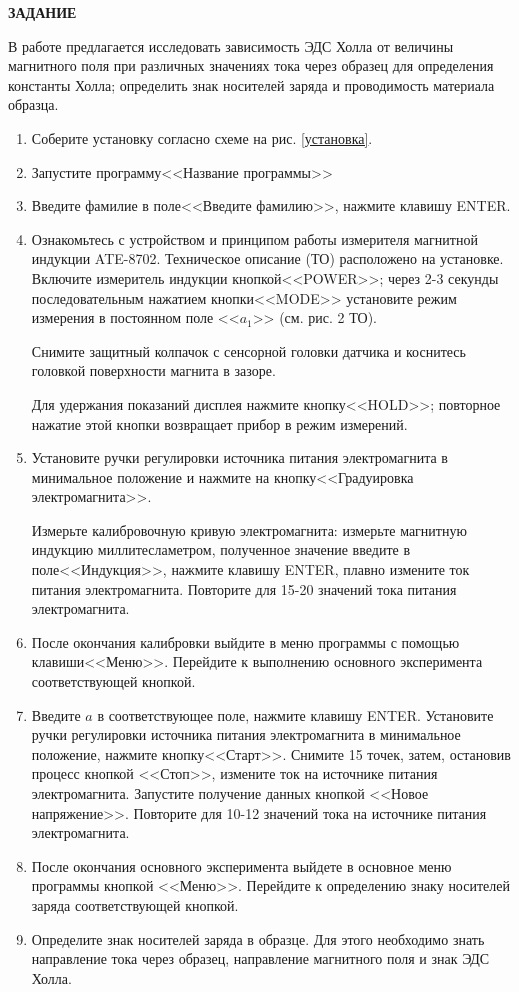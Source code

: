 \documentclass[a4paper,12pt]{article} %
\begin{document}
\begin{center}
\textsf{\textbf{ЗАДАНИЕ}}
\end{center}
В работе предлагается исследовать зависимость ЭДС Холла от величины магнитного поля при различных значениях тока через образец для
определения константы Холла; определить знак носителей заряда и проводимость материала образца.


\begin{enumerate} 
  \item Соберите установку согласно схеме на рис. \ref{установка}.
  \item Запустите программу<<Название программы>>
  \item Введите фамилие в поле<<Введите фамилию>>, нажмите клавишу ENTER.
  
  \item Ознакомьтесь с устройством и принципом работы измерителя магнитной индукции ATE-8702. Техническое описание (ТО) расположено на установке.
  Включите измеритель индукции кнопкой<<POWER>>; через 2-3 секунды последовательным нажатием кнопки<<MODE>> установите режим измерения в постоянном поле <<$a_1$>> (см. рис. 2 ТО).
  
  Снимите защитный колпачок с сенсорной головки датчика и коснитесь головкой поверхности магнита в зазоре.
  
  Для удержания показаний дисплея нажмите кнопку<<HOLD>>; повторное нажатие этой кнопки возвращает прибор в режим измерений.
  
  \item Установите ручки регулировки источника питания электромагнита в минимальное положение и нажмите на кнопку<<Градуировка электромагнита>>.
  
   Измерьте калибровочную кривую электромагнита: измерьте магнитную индукцию миллитесламетром, полученное значение введите в поле<<Индукция>>, нажмите клавишу ENTER, плавно измените ток питания электромагнита. Повторите для 15-20 значений тока питания электромагнита.
  \item После окончания калибровки выйдите в меню программы с помощью клавиши<<Меню>>. Перейдите к выполнению основного эксперимента соответствующей кнопкой.
  \item Введите $a$ в соответствующее поле, нажмите клавишу ENTER. Установите ручки регулировки источника питания электромагнита в минимальное положение, нажмите кнопку<<Старт>>. Снимите 15 точек, затем, остановив процесс кнопкой <<Стоп>>, измените ток на источнике питания электромагнита. Запустите получение данных кнопкой <<Новое напряжение>>. Повторите для 10-12 значений тока на источнике питания электромагнита.
  \item После окончания основного эксперимента выйдете в основное меню программы кнопкой <<Меню>>. Перейдите к определению знаку носителей заряда соответствующей кнопкой.
  \item Определите знак носителей заряда в образце. Для этого необходимо
знать направление тока через образец, направление магнитного поля
и знак ЭДС Холла.


\end{enumerate}
\end{document}
